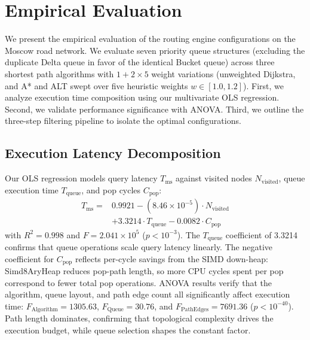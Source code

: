 \section{Empirical Evaluation}
\label{sec:evaluation}

We present the empirical evaluation of the routing engine configurations on the Moscow road network. We evaluate seven priority queue structures (excluding the duplicate Delta queue in favor of the identical Bucket queue) across three shortest path algorithms with $1 + 2 \times 5$ weight variations (unweighted Dijkstra, and A* and ALT swept over five heuristic weights $w \in [1.0, 1.2]$). First, we analyze execution time composition using our multivariate OLS regression. 
Second, we validate performance significance with ANOVA. 
Third, we outline the three-step filtering pipeline to isolate the optimal configurations.

\subsection{Execution Latency Decomposition}
Our OLS regression models query latency $T_{\text{ms}}$ against visited nodes $N_{\text{visited}}$, queue execution time $T_{\text{queue}}$, and pop cycles $C_{\text{pop}}$:
\begin{equation}
\begin{aligned}
T_{\text{ms}} = & 0.9921 - (8.46 \times 10^{-5}) \cdot N_{\text{visited}} \\
& + 3.3214 \cdot T_{\text{queue}} - 0.0082 \cdot C_{\text{pop}}
\end{aligned}
\label{eq:ols_formula}
\end{equation}
with $R^2 = 0.998$ and $F = 2.041 \times 10^{5}$ ($p < 10^{-3}$). The $T_{\text{queue}}$ coefficient of 3.3214 confirms that queue operations scale query latency linearly. The negative coefficient for $C_{\text{pop}}$ reflects per-cycle savings from the SIMD down-heap: Simd8AryHeap reduces pop-path length, so more CPU cycles spent per pop correspond to fewer total pop operations. ANOVA results verify that the algorithm, queue layout, and path edge count all significantly affect execution time: $F_{\text{Algorithm}} = 1305.63$, $F_{\text{Queue}} = 30.76$, and $F_{\text{PathEdges}} = 7691.36$ ($p < 10^{-40}$). Path length dominates, confirming that topological complexity drives the execution budget, while queue selection shapes the constant factor.

